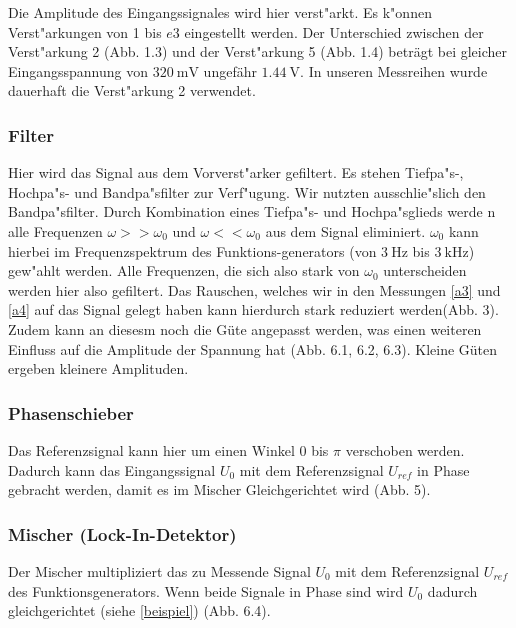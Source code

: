 \documentclass{scrartcl}
\begin{document}
				Die Amplitude des Eingangssignales wird hier verst"arkt. Es k"onnen Verst"arkungen von 1 bis $e3$ eingestellt werden.
				Der Unterschied zwischen der Verst"arkung 2 (Abb. 1.3) und der Verst"arkung 5 (Abb. 1.4) beträgt bei gleicher 
				Eingangsspannung von $\SI{320}{\milli\volt}$ ungefähr $\SI{1,44}{\volt}$. In unseren Messreihen wurde dauerhaft die Verst"arkung 2 verwendet. 

			\subsubsection{Filter}

				Hier wird das Signal aus dem Vorverst"arker gefiltert. Es stehen Tiefpa"s-, Hochpa"s- und Bandpa"sfilter zur Verf"ugung.
				Wir nutzten ausschlie"slich den Bandpa"sfilter. Durch Kombination eines Tiefpa"s- und Hochpa"sglieds werde n alle Frequenzen
				$\omega >> \omega_0$ und $\omega << \omega_0$ aus dem Signal eliminiert.
				$\omega_0$ kann hierbei im Frequenzspektrum des Funktions-generators (von $\SI{3}{\hertz}$ bis $\SI{3}{\kilo\hertz}$) gew"ahlt werden.
				Alle Frequenzen, die sich also stark von $\omega_0$ unterscheiden werden hier also gefiltert.
				Das Rauschen, welches wir in den Messungen \ref{a3} und \ref{a4} auf das Signal gelegt haben kann hierdurch stark reduziert werden(Abb. 3).
				Zudem kann an diesesm noch die Güte angepasst werden, was einen weiteren Einfluss auf die Amplitude der Spannung hat (Abb. 6.1, 6.2, 6.3).
				Kleine Güten ergeben kleinere Amplituden.

			\subsubsection{Phasenschieber}

				Das Referenzsignal kann hier um einen Winkel $0$ bis $\pi$ verschoben werden.
				Dadurch kann das Eingangssignal $U_0$ mit dem Referenzsignal $U_{ref}$ in Phase gebracht werden,
				damit es im Mischer Gleichgerichtet wird (Abb. 5).

			\subsubsection{Mischer (Lock-In-Detektor)}

				Der Mischer multipliziert das zu Messende Signal $U_0$ mit dem Referenzsignal $U_{ref}$ des Funktionsgenerators. Wenn beide Signale in Phase sind wird $U_0$ dadurch gleichgerichtet (siehe \ref{beispiel}) (Abb. 6.4).
\end{document}

